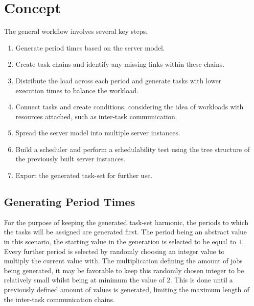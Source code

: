 
\cite{dar-tzenpengAssignmentSchedulingCommunicating1997}


\section{Concept}\label{sec:concept}
The general workflow involves several key steps. 
\begin{enumerate}
	\item Generate period times based on the server model. 
	\item Create task chains and identify any missing links within these chains. 
	\item Distribute the load across each period and generate tasks with lower execution times to balance the workload.
	\item Connect tasks and create conditions, considering the idea of workloads with resources attached, such as inter-task communication. 
	\item Spread the server model into multiple server instances. 
	\item Build a scheduler and perform a schedulability test using the tree structure of the previously built server instances.
	\item Export the generated task-set for further use.
\end{enumerate}

\subsection{Generating Period Times}\label{sec:generating_period_times}
For the purpose of keeping the generated task-set harmonic, the periods to which the tasks will be assigned are generated first.
The period being an abstract value in this scenario, the starting value in the generation is selected to be equal to $1$.
Every further period is selected by randomly choosing an integer value to multiply the current value with.
The multiplication defining the amount of jobs being generated, it may be favorable to keep this randomly chosen integer to be relatively small whilst being at minimum the value of $2$. 
This is done until a previously defined amount of values is generated, limiting the maximum length of the inter-task communication chains.

